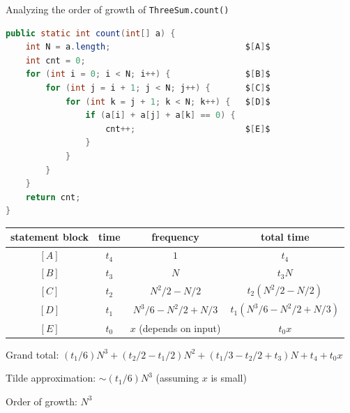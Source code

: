 \documentclass[8pt,a4paper,compress]{beamer}
\begin{document}
\begin{frame}[fragile]
\pause

Analyzing the order of growth of \lstinline{ThreeSum.count()}

\smallskip

\begin{lstlisting}[language=Java, mathescape,style=focusin]
public static int count(int[] a) {
    int N = a.length;                           $[A]$
    int cnt = 0;
    for (int i = 0; i < N; i++) {               $[B]$ 
        for (int j = i + 1; j < N; j++) {       $[C]$
            for (int k = j + 1; k < N; k++) {   $[D]$
                if (a[i] + a[j] + a[k] == 0) {
                    cnt++;                      $[E]$
                }
            }
        }
    }
    return cnt;
}
\end{lstlisting}

\pause

\begin{center}
\begin{tabular}{cccc}
statement block & time & frequency & total time\\ \hline
$[A]$ & $t_4$ & $1$  & $t_4$ \\
$[B]$ & $t_3$ & $N$  & $t_3N$ \\
$[C]$ & $t_2$ & $N^2/2-N/2$  & $t_2(N^2/2-N/2)$ \\
$[D]$ & $t_1$ & $N^3/6-N^2/2+N/3$  & $t_1(N^3/6-N^2/2+N/3)$ \\
$[E]$ & $t_0$ & $x$ (depends on input) & $t_0x$
\end{tabular} 
\end{center}

\pause

Grand total: $(t_1/6)N^3+(t_2/2-t_1/2)N^2+(t_1/3-t_2/2+t_3)N+t_4+t_0x$

\pause
\smallskip

Tilde approximation: $\sim(t_1/6)N^3$ (assuming $x$ is small)

\pause
\smallskip

Order of growth: $N^3$
\end{frame}
\end{document}
